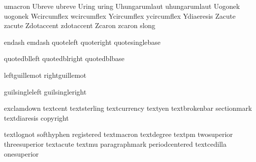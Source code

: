  umacron       {}
 Ubreve        {}
 ubreve        {}
 Uring         {}
 uring         {}
 Uhungarumlaut {}
 uhungarumlaut {}
 Uogonek       {}
 uogonek       {}
 Wcircumflex   {}
 wcircumflex   {}
 Ycircumflex   {}
 ycircumflex   {}
 Ydiaeresis    {}
 Zacute        {}
 zacute        {}
 Zdotaccent    {}
 zdotaccent    {}
 Zcaron        {}
 zcaron        {}
 slong         {}

\stopencoding

\startencoding[uc]

 endash          {}
 emdash          {}
 quoteleft       {}
 quoteright      {}
 quotesinglebase {}

 quotedblleft    {}
 quotedblright   {}
 quotedblbase    {}

 leftguillemot   {}
 rightguillemot  {}

 guilsingleleft  {}
 guilsingleright {}

\stopencoding


\startencoding[uc]

 exclamdown       {}
 textcent         {}
 textsterling     {}
 textcurrency     {}
 textyen          {}
 textbrokenbar    {}
 sectionmark      {}
 textdiaresis     {}
 copyright        {}

 textlognot       {}
 softhyphen       {}
 registered       {}
 textmacron       {}
 textdegree       {}
 textpm           {}
 twosuperior      {}
 threesuperior    {}
 textacute        {}
 textmu           {}
 paragraphmark    {}
 periodcentered   {}
 textcedilla      {}
 onesuperior      {}

